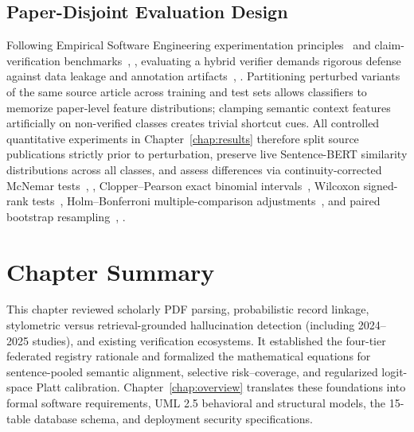 \subsection{Paper-Disjoint Evaluation Design}

Following Empirical Software Engineering experimentation principles~\cite{wohlin2012experimentation} and claim-verification benchmarks~\cite{thorne2018fever}, \cite{wadden2020scifact}, evaluating a hybrid verifier demands rigorous defense against data leakage and annotation artifacts~\cite{gururangan2018annotation}, \cite{poliak2018hypothesis}. Partitioning perturbed variants of the same source article across training and test sets allows classifiers to memorize paper-level feature distributions; clamping semantic context features artificially on non-verified classes creates trivial shortcut cues. All controlled quantitative experiments in Chapter~\ref{chap:results} therefore split source publications strictly prior to perturbation, preserve live Sentence-BERT similarity distributions across all classes, and assess differences via continuity-corrected McNemar tests~\cite{mcnemar1947}, \cite{dietterich1998approximate}, Clopper--Pearson exact binomial intervals~\cite{clopper1934}, Wilcoxon signed-rank tests~\cite{wilcoxon1945}, Holm--Bonferroni multiple-comparison adjustments~\cite{holm1979simple}, and paired bootstrap resampling~\cite{bergkirkpatrick2012empirical}, \cite{dror2018hitchhiker}.

\section{Chapter Summary}

This chapter reviewed scholarly PDF parsing, probabilistic record linkage, stylometric versus retrieval-grounded hallucination detection (including 2024--2025 studies), and existing verification ecosystems. It established the four-tier federated registry rationale and formalized the mathematical equations for sentence-pooled semantic alignment, selective risk--coverage, and regularized logit-space Platt calibration. Chapter~\ref{chap:overview} translates these foundations into formal software requirements, UML 2.5 behavioral and structural models, the 15-table database schema, and deployment security specifications.
